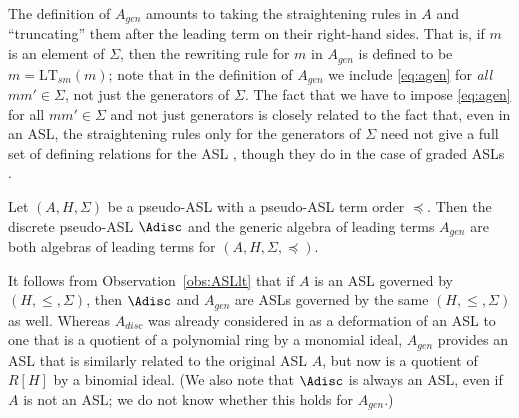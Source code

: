 \documentclass[11pt,reqno]{amsart}
\newcommand{\ltsm}{\text{LT}_{sm}}
\theoremstyle{definition}
\numberwithin{equation}{section}
\begin{document}
The definition of $A_{gen}$ amounts to taking the straightening rules in $A$ and ``truncating'' them after the leading term on their right-hand sides. That is, if $m$ is an element of $\Sigma$, then the rewriting rule for $m$ in $A_{gen}$ is defined to be $m = \ltsm(m)$; note that in the definition of $A_{gen}$ we include \eqref{eq:agen} for \emph{all} $mm' \in \Sigma$, not just the generators of $\Sigma$. The fact that we have to impose \eqref{eq:agen} for all $mm' \in \Sigma$ and not just generators is closely related to the fact that, even in an ASL, the straightening rules only for the generators of $\Sigma$ need not give a full set of defining relations for the ASL \cite{trung,GrabePauer}, though they do  in the case of graded ASLs \cite[Prop.~1.1]{deconcini1987hodge}.

\begin{proposition} \label{prop:agen-adisc}
Let  $(A, H, \Sigma)$ be a pseudo-ASL with a pseudo-ASL term order $\preceq$. Then the discrete pseudo-ASL $\Adisc$ and the generic algebra of leading terms $A_{gen}$ are both algebras of leading terms for $(A, H, \Sigma, \preceq)$. 
\end{proposition}

It follows from Observation~\ref{obs:ASLlt} that if $A$ is an ASL governed by  $(H,\leq,\Sigma)$, then $\Adisc$ and $A_{gen}$ are ASLs governed by the same $(H,\leq,\Sigma)$ as well. Whereas $A_{disc}$ was already considered in \cite{deconcini1987hodge} as a deformation of an ASL to one that is a quotient of a polynomial ring by a monomial ideal, $A_{gen}$ provides an ASL that is similarly related to the original ASL $A$, but now is a quotient of $R[H]$ by a binomial ideal. (We also note that $\Adisc$ is always an ASL, even if $A$ is not an ASL; we do not know whether this holds for $A_{gen}$.)
\end{document}
